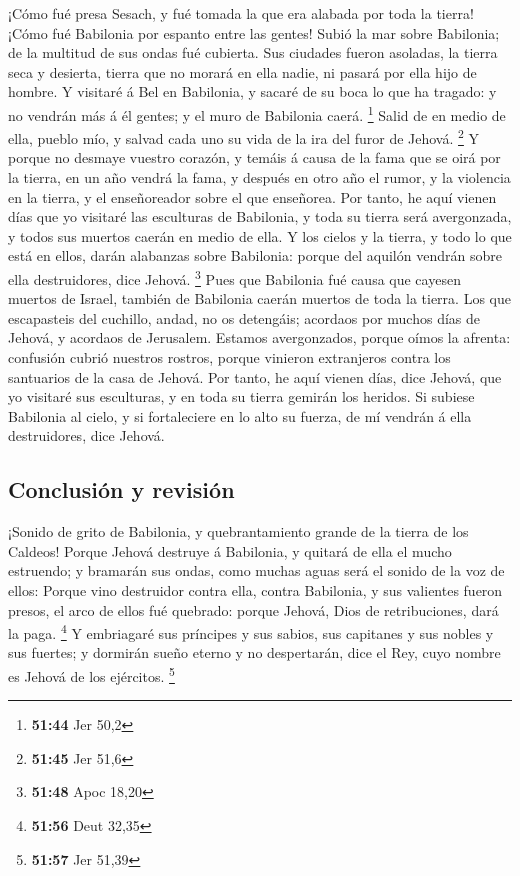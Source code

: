  ¡Cómo fué presa Sesach, y fué tomada la que era alabada
por toda la tierra! ¡Cómo fué Babilonia por espanto entre las gentes!
 Subió la mar sobre Babilonia; de la multitud de sus ondas
fué cubierta.  Sus ciudades fueron asoladas, la tierra seca
y desierta, tierra que no morará en ella nadie, ni pasará por ella hijo
de hombre.  Y visitaré á Bel en Babilonia, y sacaré de su
boca lo que ha tragado: y no vendrán más á él gentes; y el muro de
Babilonia caerá. \footnote{\textbf{51:44} Jer 50,2}  Salid
de en medio de ella, pueblo mío, y salvad cada uno su vida de la ira del
furor de Jehová. \footnote{\textbf{51:45} Jer 51,6}  Y
porque no desmaye vuestro corazón, y temáis á causa de la fama que se
oirá por la tierra, en un año vendrá la fama, y después en otro año el
rumor, y la violencia en la tierra, y el enseñoreador sobre el que
enseñorea.  Por tanto, he aquí vienen días que yo visitaré
las esculturas de Babilonia, y toda su tierra será avergonzada, y todos
sus muertos caerán en medio de ella.  Y los cielos y la
tierra, y todo lo que está en ellos, darán alabanzas sobre Babilonia:
porque del aquilón vendrán sobre ella destruidores, dice Jehová.
\footnote{\textbf{51:48} Apoc 18,20}  Pues que Babilonia
fué causa que cayesen muertos de Israel, también de Babilonia caerán
muertos de toda la tierra.  Los que escapasteis del
cuchillo, andad, no os detengáis; acordaos por muchos días de Jehová, y
acordaos de Jerusalem.  Estamos avergonzados, porque oímos
la afrenta: confusión cubrió nuestros rostros, porque vinieron
extranjeros contra los santuarios de la casa de Jehová. 
Por tanto, he aquí vienen días, dice Jehová, que yo visitaré sus
esculturas, y en toda su tierra gemirán los heridos.  Si
subiese Babilonia al cielo, y si fortaleciere en lo alto su fuerza, de
mí vendrán á ella destruidores, dice Jehová.

\hypertarget{conclusiuxf3n-y-revisiuxf3n}{%
\subsection{Conclusión y revisión}\label{conclusiuxf3n-y-revisiuxf3n}}

 ¡Sonido de grito de Babilonia, y quebrantamiento grande de
la tierra de los Caldeos!  Porque Jehová destruye á
Babilonia, y quitará de ella el mucho estruendo; y bramarán sus ondas,
como muchas aguas será el sonido de la voz de ellos: 
Porque vino destruidor contra ella, contra Babilonia, y sus valientes
fueron presos, el arco de ellos fué quebrado: porque Jehová, Dios de
retribuciones, dará la paga. \footnote{\textbf{51:56} Deut 32,35}
 Y embriagaré sus príncipes y sus sabios, sus capitanes y
sus nobles y sus fuertes; y dormirán sueño eterno y no despertarán, dice
el Rey, cuyo nombre es Jehová de los ejércitos. \footnote{\textbf{51:57}
  Jer 51,39}

